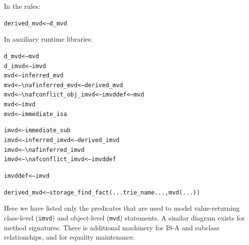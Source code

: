 \documentclass[11pt]{article}
\newcommand{\bs}{\textbackslash}
\newcommand{\RULELOGNAF}{{\texttt{{\bs}naf}}\xspace}
\begin{document}
\noindent
In the rules:
\begin{alltt}
derived\_mvd <--- d\_mvd  
\end{alltt}
\noindent
In auxiliary runtime libraries:
\begin{alltt}
d\_mvd  <---  mvd 
d\_imvd <--- imvd 
          mvd <---      inferred\_mvd 
          mvd <--- \RULELOGNAF inferred\_mvd        <--- derived\_mvd 
          mvd <--- \RULELOGNAF conflict\_obj\_imvd   <--- imvddef <--- mvd 
          mvd <---      imvd 
          mvd <---      immediate\_isa 
 
         imvd <---      immediate\_sub 
         imvd <---      inferred\_imvd             <--- derived\_imvd 
         imvd <--- \RULELOGNAF inferred\_imvd 
         imvd <--- \RULELOGNAF conflict\_imvd      <--- imvddef 
 
      imvddef <---      imvd 
 
  derived\_mvd <--- storage\_find\_fact(...trie\_name..., mvd(...))
\end{alltt}
Here we have listed only the predicates that are used to model value-returning
class-level ({\tt imvd}) and object-level ({\tt mvd}) statements.  A similar
diagram exists for
method signatures. There is additional machinery for
IS-A and subclass relationships, and for equality maintenance.
\end{document}
